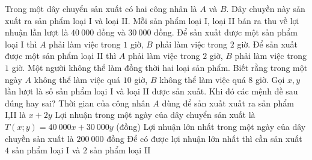 \begin{ex}%
	Trong một dây chuyển sản xuất có hai công nhân là $A$ và $B$. Dây chuyền này sản xuất ra sản phẩm loại I và loại II. Mỗi sản phẩm loại I, loại II bán ra thu về lợi nhuận lần lượt là $40~000$ đồng và $30~000$ đồng. Để sản xuất được một sản phẩm loại I thì $A$ phải làm việc trong $1$ giờ, $B$ phải làm việc trong $2$ giờ. Để sản xuất được một sản phẩm loại II thì $A$ phải làm việc trong $2$ giờ, $B$ phải làm việc trong $1$ giờ. Một người không thể làm đồng thời hai loại sản phẩm. Biết rằng trong một ngày $A$ không thể làm việc quá $10$ giờ, $B$ không thể làm việc quá $8$ giờ. Gọi $x, y$ lần lượt là số sản phẩm loại I và loại II được sản xuất. Khi đó các mệnh đề sau đúng hay sai?
	\choiceTF
	{\True Thời gian của công nhân $A$ dùng để sản xuất xuất ra sản phẩm I,II là $x+2y$}
	{\True Lợi nhuận trong một ngày của dây chuyển sản xuất là $T\left(x;y\right)=40~000x+30~000y$ (đồng)} 
	{\True Lợi nhuận lớn nhất trong một ngày của dây chuyền sản xuất là $200~000$ đồng} 
	{Để có được lợi nhuận lớn nhất thì cần sản xuất $4$ sản phẩm loại I và $2$ sản phẩm loại II}
\end{ex}
